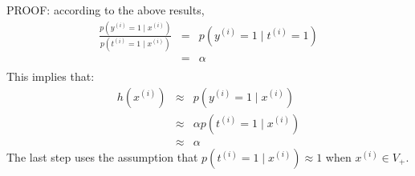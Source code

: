 \begin{answer}

PROOF: according to the above results, 
\begin{eqnarray*}
\frac{p(y^{(i)} = 1\mid x^{(i)}) } {p(t^{(i)} = 1\mid x^{(i)})} 
    &=& p(y^{(i)} = 1 \mid t^{(i)} = 1) \\
    &=& \alpha \\
\end{eqnarray*}
This implies that:
\begin{eqnarray*}
h(x^{(i)}) 
    &\approx& p(y^{(i)} = 1\mid x^{(i)}) \\
    &\approx& \alpha p(t^{(i)} = 1\mid x^{(i)}) \\
    &\approx& \alpha
\end{eqnarray*}
The last step uses the assumption that $p(t^{(i)} = 1\mid x^{(i)})\approx 1$ when
$x^{(i)}\in V_{+}$.
\end{answer}

